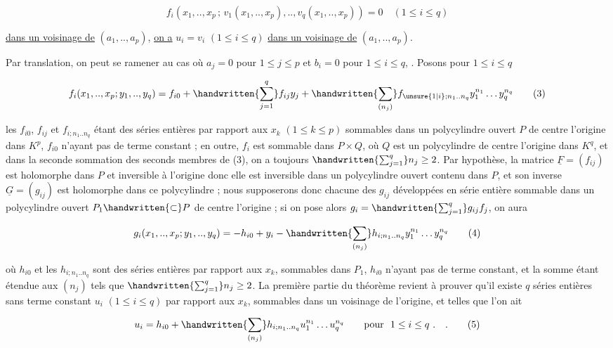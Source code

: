 
\[
f_i(x_1,..,x_p\,;\,v_1(x_1,..,x_p),..,v_q(x_1,..,x_p))=0
\quad(1\leq i\leq q)\tag*{(2)}
\]

\uline{dans un voisinage de} $(a_1,..,a_p)$, \uline{on a} $u_i=v_i$ $(1\leq i\leq q)$ \uline{dans un voisinage de} $(a_1,..,a_p)$.

Par tra\handwritten{\unsure{-|{}}}nslation, on peut se ramener au cas où $a_j=0$ pour $1\leq j\leq p$ et $b_i=0$ pour $1\leq i\leq q$, . Posons pour $1\leq i\leq q$

\[
f_i(x_1,..,x_p;y_1,..,y_q)=f_{i0}+
\handwritten{\sum_{j=1}^{q}}f_{ij}y_j+
\handwritten{\sum_{(n_j)}}f_{\unsure{1|i};n_1..n_q}y_1^{n_1}\ldots y_q^{n_q}\tag*{(3)}
\]

les $f_{i0}$, $f_{ij}$ et $f_{i;n_1..n_q}$ étant des séries entières par rapport aux $x_k$ $(1\leq k\leq p)$ sommables dans un polycylindre ouvert $P$ de centre l'origine dans $K^p$, $f_{i0}$ n'ayant pas de terme constant ; en outre, $f_i$ est sommable dans $P\times Q$, où $Q$ est un polycylindre de centre l'origine dans $K^q$, et dans la seconde sommation des seconds membres de (3), on a toujours $\handwritten{\sum_{j=1}^{q}}n_j\geq 2$. Par hypothèse, la matrice $\underline F=(f_{ij})$ est holomorphe dans $P$ et inversible à l'origine donc elle est inversible dans un polycylindre ouvert contenu dans $P$, et son inverse $\underline G=(g_{ij})$ est holomorphe dans ce polycylindre ; nous supposerons donc chacune des $g_{ij}$ développées en série entière sommable dans un polycylindre ouvert $P_1\handwritten{\subset} P$ de centre l'origine ; si on pose alors $g_i=\handwritten{\sum_{j=1}^{q}}g_{ij}f_j$, on aura

\[
g_i(x_1,..,x_p;y_1,..,y_q)=-h_{i0}+y_i-
\handwritten{\sum_{(n_j)}}h_{i;n_1..n_q}y_1^{n_1}\ldots y_q^{n_q}\tag*{(4)}
\]

où $h_{i0}$ et les $h_{i;n_1..n_q}$ sont des séries entières par rapport aux $x_k$, sommables dans $P_1$, $h_{i0}$ n'ayant pas de terme constant, et la somme étant étendue aux $(n_j)$ tels que $\handwritten{\sum_{j=1}^{q}} n_j\geq 2$. La première partie du théorème revient à prouver qu'il existe $q$ séries entières sans terme constant $u_i$ $(1\leq i\leq q)$ par rapport aux $x_k$, sommables dans un voisinage de l'origine, et telles que l'on ait

\[
u_i=h_{i0}+\handwritten{\sum_{(n_j)}}h_{i;n_1..n_q}u_1^{n_1}\ldots u_q^{n_q}
\qquad\text{pour }\ 1\leq i\leq q\ .\quad .\tag*{(5)}
\]

